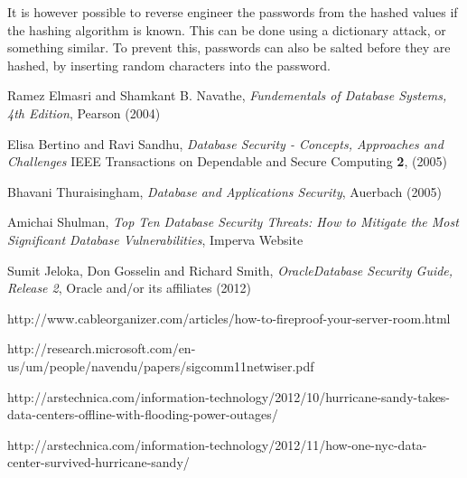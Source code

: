 \documentclass[11pt, twocolumn]{article}
\begin{document}
It is however possible to reverse engineer the passwords from the hashed values if the hashing algorithm is known. This can be done using a dictionary attack, or something similar. To prevent this, passwords can also be salted before they are hashed, by inserting random characters into the password.\cite{salt}

\balance
\begin{thebibliography}{}

  Ramez Elmasri and Shamkant B. Navathe, {\it Fundementals of Database Systems, 4th Edition}, Pearson (2004)

  Elisa Bertino and Ravi Sandhu, {\it Database Security - Concepts, Approaches and Challenges} IEEE Transactions on Dependable and Secure Computing {\bf 2},  (2005)

  Bhavani Thuraisingham, {\it Database and Applications Security}, Auerbach (2005)

  Amichai Shulman, {\it Top Ten Database Security Threats: How to Mitigate the Most Significant Database Vulnerabilities}, Imperva Website

  Sumit Jeloka, Don Gosselin and Richard Smith, {\it Oracle\textregistered Database Security Guide, Release 2}, Oracle and/or its affiliates (2012)

  http://www.cableorganizer.com/articles/how-to-fireproof-your-server-room.html

  http://research.microsoft.com/en-us/um/people/navendu/papers/sigcomm11netwiser.pdf


  http://arstechnica.com/information-technology/2012/10/hurricane-sandy-takes-data-centers-offline-with-flooding-power-outages/

  http://arstechnica.com/information-technology/2012/11/how-one-nyc-data-center-survived-hurricane-sandy/


\end{thebibliography}
\end{document}
